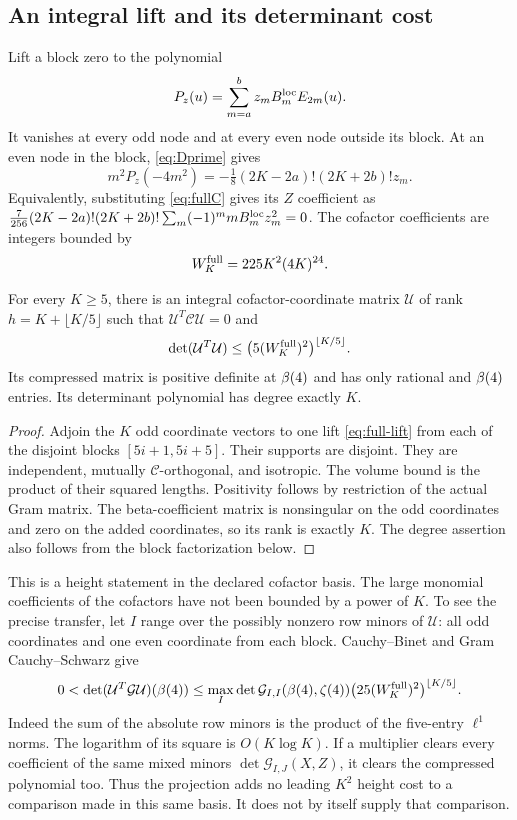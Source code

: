 \subsection{An integral lift and its determinant cost}
Lift a block zero to the polynomial
\begin{equation}\label{eq:full-lift}
 P_z(u)=\sum_{m=a}^b z_mB_m^{\rm loc}E_{2m}(u).
\end{equation}
It vanishes at every odd node and at every even node outside its block.
At an even node in the block, \eqref{eq:Dprime} gives
\[
 m^2P_z(-4m^2)
 =-\tfrac18(2K-2a)!(2K+2b)!z_m.
\]
Equivalently, substituting \eqref{eq:fullC} gives its $Z$ coefficient as
$\tfrac7{256}(2K-2a)!(2K+2b)!\sum_m(-1)^m mB_m^{\rm loc}z_m^2=0$.
The cofactor coefficients are integers bounded by
\begin{equation}\label{eq:Wfull}
 W_K^{\rm full}=225K^2(4K)^{24}.
\end{equation}

\begin{theorem}\label{thm:compression}
For every $K\geq5$, there is an integral cofactor-coordinate matrix
$\mathcal U$ of rank $h=K+\lfloor K/5\rfloor$ such that
$\mathcal U^T\mathcal C\mathcal U=0$ and
\[
 \det(\mathcal U^T\mathcal U)
 \leq\bigl(5(W_K^{\rm full})^2\bigr)^{\lfloor K/5\rfloor}.
\]
Its compressed matrix is positive definite at $\beta(4)$ and has only
rational and $\beta(4)$ entries. Its determinant polynomial has degree
exactly $K$.
\end{theorem}
\begin{proof}
Adjoin the $K$ odd coordinate vectors to one lift
\eqref{eq:full-lift} from each of the disjoint blocks
$[5i+1,5i+5]$. Their supports are disjoint. They are independent,
mutually $\mathcal C$-orthogonal, and isotropic. The volume bound is
the product of their squared lengths. Positivity follows by restriction
of the actual Gram matrix. The beta-coefficient matrix is nonsingular
on the odd coordinates and zero on the added coordinates, so its rank
is exactly $K$. The degree assertion also follows from the block
factorization below.
\end{proof}

This is a height statement in the declared cofactor basis. The large
monomial coefficients of the cofactors have not been bounded by a
power of $K$. To see the precise transfer, let $I$ range over the
possibly nonzero row minors of $\mathcal U$: all odd coordinates and
one even coordinate from each block. Cauchy--Binet and Gram
Cauchy--Schwarz give
\begin{equation}\label{eq:transfer}
 0<\det(\mathcal U^T\mathcal G\mathcal U)(\beta(4))
 \leq \max_I\det\mathcal G_{I,I}(\beta(4),\zeta(4))
              \bigl(25(W_K^{\rm full})^2\bigr)^{\lfloor K/5\rfloor}.
\end{equation}
Indeed the sum of the absolute row minors is the product of the
five-entry $\ell^1$ norms. The logarithm of its square is $O(K\log K)$.
If a multiplier clears every coefficient of the same mixed minors
$\det\mathcal G_{I,J}(X,Z)$, it clears the compressed polynomial too.
Thus the projection adds no leading $K^2$ height cost to a comparison
made in this same basis. It does not by itself supply that comparison.


